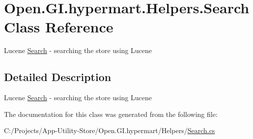 \hypertarget{class_open_1_1_g_i_1_1hypermart_1_1_helpers_1_1_search}{}\section{Open.\+G\+I.\+hypermart.\+Helpers.\+Search Class Reference}
\label{class_open_1_1_g_i_1_1hypermart_1_1_helpers_1_1_search}


Lucene \hyperlink{class_open_1_1_g_i_1_1hypermart_1_1_helpers_1_1_search}{Search} -\/ searching the store using Lucene  




\subsection{Detailed Description}
Lucene \hyperlink{class_open_1_1_g_i_1_1hypermart_1_1_helpers_1_1_search}{Search} -\/ searching the store using Lucene 



The documentation for this class was generated from the following file\+:\begin{DoxyCompactItemize}
\item 
C\+:/\+Projects/\+App-\/\+Utility-\/\+Store/\+Open.\+G\+I.\+hypermart/\+Helpers/\hyperlink{_search_8cs}{Search.\+cs}\end{DoxyCompactItemize}
